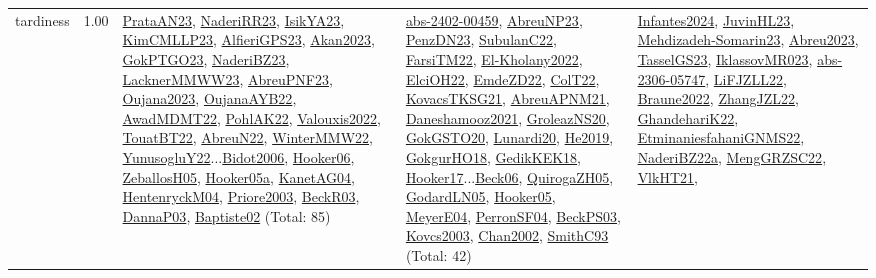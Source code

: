 {\begin{longtable}{p{3cm}r>{\raggedright\arraybackslash}p{6cm}>{\raggedright\arraybackslash}p{6cm}>{\raggedright\arraybackslash}p{8cm}}
\index{tardiness}\index{Concepts!tardiness}tardiness &  1.00 & \hyperref[detail:PrataAN23]{PrataAN23}, \hyperref[detail:NaderiRR23]{NaderiRR23}, \hyperref[detail:IsikYA23]{IsikYA23}, \hyperref[detail:KimCMLLP23]{KimCMLLP23}, \hyperref[detail:AlfieriGPS23]{AlfieriGPS23}, \hyperref[detail:Akan2023]{Akan2023}, \hyperref[detail:GokPTGO23]{GokPTGO23}, \hyperref[detail:NaderiBZ23]{NaderiBZ23}, \hyperref[detail:LacknerMMWW23]{LacknerMMWW23}, \hyperref[detail:AbreuPNF23]{AbreuPNF23}, \hyperref[detail:Oujana2023]{Oujana2023}, \hyperref[detail:OujanaAYB22]{OujanaAYB22}, \hyperref[detail:AwadMDMT22]{AwadMDMT22}, \hyperref[detail:PohlAK22]{PohlAK22}, \hyperref[detail:Valouxis2022]{Valouxis2022}, \hyperref[detail:TouatBT22]{TouatBT22}, \hyperref[detail:AbreuN22]{AbreuN22}, \hyperref[detail:WinterMMW22]{WinterMMW22}, \hyperref[detail:YunusogluY22]{YunusogluY22}...\hyperref[detail:Bidot2006]{Bidot2006}, \hyperref[detail:Hooker06]{Hooker06}, \hyperref[detail:ZeballosH05]{ZeballosH05}, \hyperref[detail:Hooker05a]{Hooker05a}, \hyperref[detail:KanetAG04]{KanetAG04}, \hyperref[detail:HentenryckM04]{HentenryckM04}, \hyperref[detail:Priore2003]{Priore2003}, \hyperref[detail:BeckR03]{BeckR03}, \hyperref[detail:DannaP03]{DannaP03}, \hyperref[detail:Baptiste02]{Baptiste02} (Total: 85) & \hyperref[detail:abs-2402-00459]{abs-2402-00459}, \hyperref[detail:AbreuNP23]{AbreuNP23}, \hyperref[detail:PenzDN23]{PenzDN23}, \hyperref[detail:SubulanC22]{SubulanC22}, \hyperref[detail:FarsiTM22]{FarsiTM22}, \hyperref[detail:El-Kholany2022]{El-Kholany2022}, \hyperref[detail:ElciOH22]{ElciOH22}, \hyperref[detail:EmdeZD22]{EmdeZD22}, \hyperref[detail:ColT22]{ColT22}, \hyperref[detail:KovacsTKSG21]{KovacsTKSG21}, \hyperref[detail:AbreuAPNM21]{AbreuAPNM21}, \hyperref[detail:Daneshamooz2021]{Daneshamooz2021}, \hyperref[detail:GroleazNS20]{GroleazNS20}, \hyperref[detail:GokGSTO20]{GokGSTO20}, \hyperref[detail:Lunardi20]{Lunardi20}, \hyperref[detail:He2019]{He2019}, \hyperref[detail:GokgurHO18]{GokgurHO18}, \hyperref[detail:GedikKEK18]{GedikKEK18}, \hyperref[detail:Hooker17]{Hooker17}...\hyperref[detail:Beck06]{Beck06}, \hyperref[detail:QuirogaZH05]{QuirogaZH05}, \hyperref[detail:GodardLN05]{GodardLN05}, \hyperref[detail:Hooker05]{Hooker05}, \hyperref[detail:MeyerE04]{MeyerE04}, \hyperref[detail:PerronSF04]{PerronSF04}, \hyperref[detail:BeckPS03]{BeckPS03}, \hyperref[detail:Kovcs2003]{Kovcs2003}, \hyperref[detail:Chan2002]{Chan2002}, \hyperref[detail:SmithC93]{SmithC93} (Total: 42) & \hyperref[detail:Infantes2024]{Infantes2024}, \hyperref[detail:JuvinHL23]{JuvinHL23}, \hyperref[detail:Mehdizadeh-Somarin23]{Mehdizadeh-Somarin23}, \hyperref[detail:Abreu2023]{Abreu2023}, \hyperref[detail:TasselGS23]{TasselGS23}, \hyperref[detail:IklassovMR023]{IklassovMR023}, \hyperref[detail:abs-2306-05747]{abs-2306-05747}, \hyperref[detail:LiFJZLL22]{LiFJZLL22}, \hyperref[detail:Braune2022]{Braune2022}, \hyperref[detail:ZhangJZL22]{ZhangJZL22}, \hyperref[detail:GhandehariK22]{GhandehariK22}, \hyperref[detail:EtminaniesfahaniGNMS22]{EtminaniesfahaniGNMS22}, \hyperref[detail:NaderiBZ22a]{NaderiBZ22a}, \hyperref[detail:MengGRZSC22]{MengGRZSC22}, \hyperref[detail:VlkHT21]{VlkHT21}, 
\end{longtable}}
